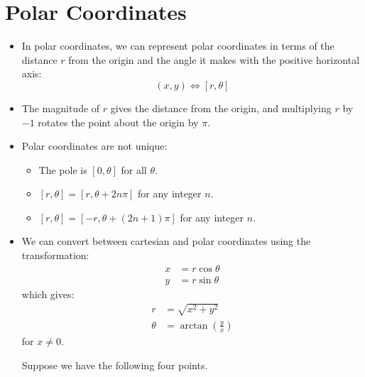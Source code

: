 \section{Polar Coordinates}
\begin{itemize}
    \item In polar coordinates, we can represent polar coordinates in terms of the distance $r$ from the origin and the angle it makes with the positive horizontal axis:
    \begin{equation}
        (x,y) \iff [r,\theta]
    \end{equation}
    \item The magnitude of $r$ gives the distance from the origin, and multiplying $r$ by $-1$ rotates the point about the origin by $\pi$.
    \item Polar coordinates are not unique:
    \begin{itemize}
        \item The pole is $[0,\theta]$ for all $\theta$.
        \item $[r, \theta] = [r ,\theta + 2n\pi]$ for any integer $n$.
        \item $[r,\theta] = [-r, \theta + (2n+1)\pi]$ for any integer $n$.
    \end{itemize}
    \item We can convert between cartesian and polar coordinates using the transformation:
    \begin{align}
        x &= r\cos\theta \\ 
        y &= r\sin\theta
    \end{align}
    which gives:
    \begin{align}
        r &= \sqrt{x^2+y^2} \\ 
        \theta &= \arctan\left(\frac{y}{x}\right)
    \end{align}
    for $x\neq 0$.
    \begin{example}
        Suppose we have the following four points.
        \begin{center}
\end{center}
\end{example}
\end{itemize}
